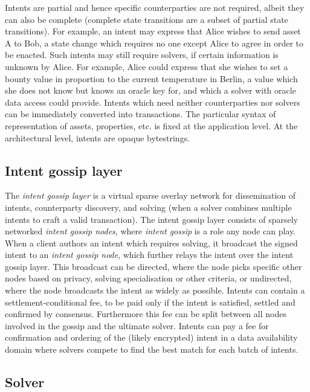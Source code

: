 Intents are partial and hence specific counterparties are not required,
albeit they can also be complete (complete state transitions are a
subset of partial state transitions). For example, an intent may express
that Alice wishes to send asset A to Bob, a state change which requires
no one except Alice to agree in order to be enacted. Such intents may
still require solvers, if certain information is unknown by Alice. For
example, Alice could express that she wishes to set a bounty value in
proportion to the current temperature in Berlin, a value which she does
not know but knows an oracle key for, and which a solver with oracle
data access could provide. Intents which need neither counterparties nor
solvers can be immediately converted into transactions. The particular
syntax of representation of assets, properties, etc. is fixed at the
application level. At the architectural level, intents are opaque
bytestrings.

\subsection{Intent gossip layer}\label{intent-gossip-layer}

The \emph{intent gossip layer} is a virtual sparse overlay network for
dissemination of intents, counterparty discovery, and solving (when a
solver combines multiple intents to craft a valid transaction). The
intent gossip layer consists of sparsely networked \emph{intent gossip
nodes}, where \emph{intent gossip} is a role any node can play. When a
client authors an intent which requires solving, it broadcast the signed
intent to an \emph{intent gossip node}, which further relays the intent
over the intent gossip layer. This broadcast can be directed, where the
node picks specific other nodes based on privacy, solving specialisation
or other criteria, or undirected, where the node broadcasts the intent
as widely as possible. Intents can contain a settlement-conditional fee,
to be paid only if the intent is satisfied, settled and confirmed by
consensus. Furthermore this fee can be split between all nodes involved
in the gossip and the ultimate solver. Intents can pay a fee for
confirmation and ordering of the (likely encrypted) intent in a data
availability domain where solvers compete to find the best match for
each batch of intents.

\subsection{Solver}\label{solver}

